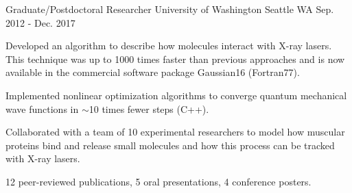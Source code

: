 \begin{cventries}

\cventry
{Graduate/Postdoctoral Researcher} %
{University of Washington} %
{Seattle WA} %
{Sep. 2012 - Dec. 2017} %
{ 
\begin{cvitems}
 \vspace{0.1cm}
\item{Developed an algorithm to describe how molecules interact with X-ray lasers. This technique was up to 1000 times faster than previous approaches and is now available in the commercial software package Gaussian16 (Fortran77).\vspace{0.1cm}}
\item{Implemented nonlinear optimization algorithms to converge quantum mechanical wave functions in $\sim$10 times fewer steps (C++).\vspace{0.1cm}}
\item{Collaborated with a team of 10 experimental researchers to model how muscular proteins bind and release small molecules and how this process can be tracked with X-ray lasers.\vspace{0.1cm}}
\item{12 peer-reviewed publications, 5 oral presentations, 4 conference posters.}
\end{cvitems}
}




\end{cventries}